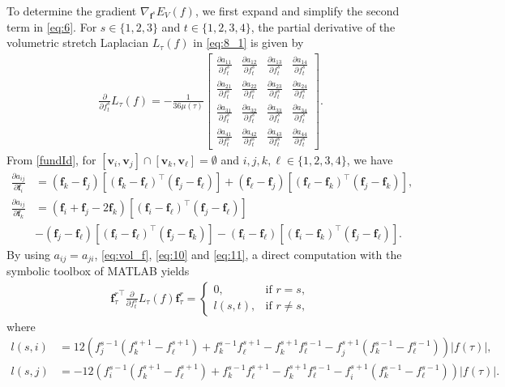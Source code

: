 \documentclass[onefignum,onetabnum]{siamonline220329}
\numberwithin{equation}{section}
\def\f{\mathbf{f}}
\def\bv{\mathbf{v}}
\begin{document}
\begin{sloppypar}
To determine the gradient $\nabla_{\mathbf{f}^s}E_V(f)$, we first expand and simplify the second term in \eqref{eq:6}.
For $s\in\{1, 2, 3\}$ and $t\in \{1, 2, 3, 4\}$, the partial derivative of the volumetric stretch Laplacian $L_{\tau}(f)$ in \eqref{eq:8_1} is given by
\begin{align}
\label{eq:10}
\frac{\partial}{\partial f_t^s}L_{\tau}(f)=-\frac{1}{36\mu(\tau)}
\begin{bmatrix}
\frac{\partial a_{11}}{\partial f_t^s}&\frac{\partial a_{12}}{\partial f_t^s}&\frac{\partial a_{13}}{\partial f_t^s}&\frac{\partial a_{14}}{\partial f_t^s}\\
\frac{\partial a_{21}}{\partial f_t^s}&\frac{\partial a_{22}}{\partial f_t^s}&\frac{\partial a_{23}}{\partial f_t^s}&\frac{\partial a_{24}}{\partial f_t^s}\\
\frac{\partial a_{31}}{\partial f_t^s}&\frac{\partial a_{32}}{\partial f_t^s}&\frac{\partial a_{33}}{\partial f_t^s}&\frac{\partial a_{34}}{\partial f_t^s}\\
\frac{\partial a_{41}}{\partial f_t^s}&\frac{\partial a_{42}}{\partial f_t^s}&\frac{\partial a_{43}}{\partial f_t^s}&\frac{\partial a_{44}}{\partial f_t^s}
\end{bmatrix}.
\end{align}
From \eqref{fundId},
for $[\bv_i, \bv_j]\cap[\bv_k, \bv_{\ell}]=\emptyset$ and $i, j, k, \ell\in \{1, 2, 3, 4\}$, we have
\begin{subequations}\label{eq:11}
\begin{align}
\frac{\partial a_{ij}}{\partial \f_{i}}&=(\f_{k}-\f_{j})[(\f_{k}-\f_{\ell})^\top(\f_{j}-\f_{\ell})]+(\f_{\ell}-\f_{j})[(\f_{\ell}-\f_{k})^\top(\f_{j}-\f_{k})], \\
\frac{\partial a_{ij}}{\partial \f_{k}}
&=(\f_{i}+\f_{j}-2\f_{k})[(\f_{i}-\f_{\ell})^\top(\f_{j}-\f_{\ell})]\\
&-(\f_{j}-\f_{\ell})[(\f_{i}-\f_{\ell})^\top(\f_{j}-\f_{k})]-(\f_{i}-\f_{\ell})[(\f_{i}-\f_{k})^\top(\f_{j}-\f_{\ell})]\nonumber.
\end{align}
\end{subequations} 
By using $a_{ij} = a_{ji}$, \eqref{eq:vol_f}, \eqref{eq:10} and \eqref{eq:11}, a direct computation  with the symbolic toolbox of MATLAB yields 
\begin{align}
{\mathbf{f}^r_{\tau}}^{\top}\frac{\partial}{\partial f_t^s}L_{\tau}(f)\mathbf{f}^r_{\tau}=
\begin{cases}
0, & \text{if $r=s$},\\
l(s, t), & \text{if $r\neq s$},
\end{cases} \label{eq:fTpartf_b}
\end{align}
where 
\begin{align*}
l(s, i) &=
12\left(f_j^{s-1}(f_k^{s+1}-f_\ell^{s+1})+f_k^{s-1}f_\ell^{s+1}-f_k^{s+1}f_\ell^{s-1}-f_j^{s+1}(f_k^{s-1}-f_\ell^{s-1})\right) |f(\tau)|,  \\ 
l(s, j) &=
-12\left(f_i^{s-1}(f_k^{s+1}-f_\ell^{s+1})+f_k^{s-1}f_\ell^{s+1}-f_k^{s+1}f_\ell^{s-1}-f_i^{s+1}(f_k^{s-1}-f_\ell^{s-1})\right) |f(\tau)|. 
\end{align*}


\end{sloppypar}
\end{document}
